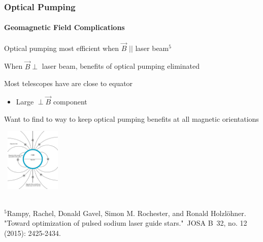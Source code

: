 \documentclass{beamer}
\begin{document}
\begin{frame}
  \frametitle{Optical Pumping}
  \framesubtitle{Geomagnetic Field Complications}
  \begin{itemize}
	\item Optical pumping most efficient when $\vec B$ $||$   laser beam$^5$
	\item When $\vec B \perp$  laser beam, benefits of optical pumping eliminated
	  \begin{minipage}{.5\textwidth}
	\item Most telescopes have are close to equator
	  \begin{itemize}
		\item Large $\perp \vec B$ component
	  \end{itemize}
	\item Want to find to way to keep optical pumping benefits at all magnetic orientations
	\end{minipage}
  \end{itemize}
\hfill
\begin{minipage}{.35\textwidth}
  \begin{center}
	\vspace{-3cm}
	\includegraphics[width = 3cm, height = 3cm]{Images/magneticfield.jpg}
\end{center}
\end{minipage}
  \bigskip
 \\ {\tiny $^5$Rampy, Rachel, Donald Gavel, Simon M. Rochester, and Ronald Holzlöhner. "Toward optimization of pulsed sodium laser guide stars." JOSA B 32, no. 12 (2015): 2425-2434.}


\end{frame}



\end{document}
